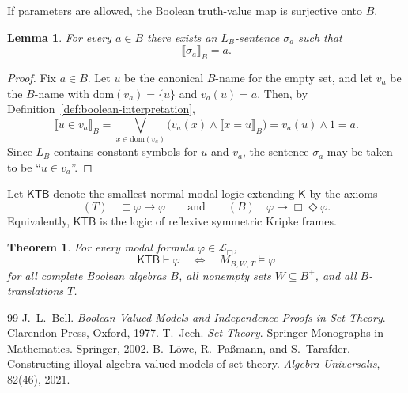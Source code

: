 \documentclass[10pt,a4paper]{amsart}
\newtheorem{theorem}[definition]{Theorem}
\newtheorem{lemma}[definition]{Lemma}
\newcommand{\Lbox}{\mathcal L_{\Box}} %
\newcommand{\KTB}{\mathsf{KTB}}
\begin{document}
If parameters are allowed, the Boolean truth-value map is surjective onto $B$.

\begin{lemma}\label{lem:truth-value-surjective}
For every $a\in B$ there exists an $L_B$-sentence $\sigma_a$ such that
\[
\llbracket \sigma_a\rrbracket_B=a.
\]
\end{lemma}

\begin{proof}
Fix $a\in B$. Let $u$ be the canonical $B$-name for the empty set, and let $v_a$ be the $B$-name
with $\mathrm{dom}(v_a)=\{u\}$ and $v_a(u)=a$. Then, by Definition~\ref{def:boolean-interpretation},
\[
\llbracket u\in v_a\rrbracket_B
=\bigvee_{x\in\mathrm{dom}(v_a)}\bigl(v_a(x)\wedge \llbracket x=u\rrbracket_B\bigr)
=v_a(u)\wedge 1
=a.
\]
Since $L_B$ contains constant symbols for $u$ and $v_a$, the sentence $\sigma_a$ may be taken to
be ``$u\in v_a$''.
\end{proof}

Let $\KTB$ denote the smallest normal modal logic extending $\mathsf{K}$ by the axioms
\[
(T)\quad \Box\varphi\to\varphi
\qquad\text{and}\qquad
(B)\quad \varphi\to\Box\Diamond\varphi.
\]
Equivalently, $\KTB$ is the logic of reflexive symmetric Kripke frames.

\begin{theorem}\label{thm:KTB-completeness}
For every modal formula $\varphi\in \Lbox$,
\[
\KTB\vdash \varphi
\quad\Longleftrightarrow\quad
M_{B,W,T}\models \varphi
\]
for all complete Boolean algebras $B$, all nonempty sets $W\subseteq B^+$, and all
$B$-translations $T$.
\end{theorem}


\begin{thebibliography}{99}
 J.~L.~Bell. \newblock \emph{Boolean-Valued Models and Independence Proofs in Set Theory}. \newblock Clarendon Press, Oxford, 1977.
 T.~Jech. \newblock \emph{Set Theory}. \newblock Springer Monographs in Mathematics. Springer, 2002.
 B.~L\"owe, R.~Pa{\ss}mann, and S.~Tarafder. \newblock Constructing illoyal algebra-valued models of set theory. \newblock \emph{Algebra Universalis}, 82(46), 2021.
\end{thebibliography}
\end{document}
